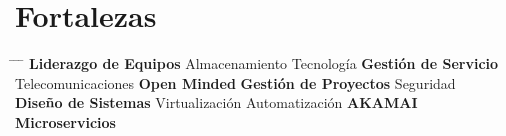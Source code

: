 \documentclass[11pt,a4paper]{moderncv}
\begin{document}
\maketitle

\section{Fortalezas}
\begin{tabbing}
\hspace*{4.5cm} \= \hspace*{4.5cm} \= \hspace*{4.5cm} \= \hspace*{4.5cm} \kill
\textbf{Liderazgo de Equipos} \> Almacenamiento \> Tecnología \> \textbf{Gestión de Servicio}\\
Telecomunicaciones \> \textbf{Open Minded} \> \textbf{Gestión de Proyectos} \> Seguridad\\
\textbf{Diseño de Sistemas} \> Virtualización \> Automatización \> \textbf{AKAMAI}   \\
\textbf{Microservicios} \\

\end{tabbing}
\end{document}
